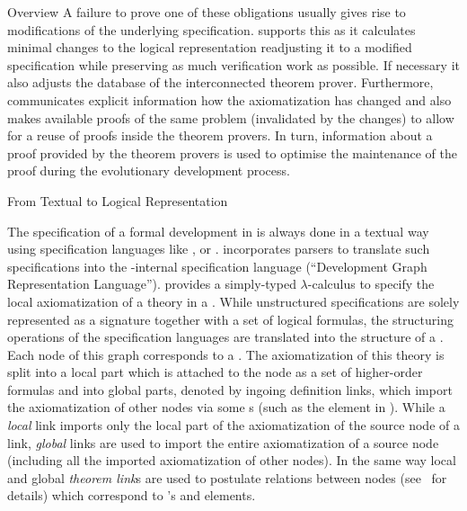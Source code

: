 \begin{omgroup}[id=maya,short=\maya,creators={autexier,hutter,mossakowski,shairer}]
\begin{omgroup}{Overview}
A failure to prove one of these obligations usually gives rise to modifications of the
underlying specification.  {\maya} supports this {} as it
calculates minimal changes to the logical representation readjusting it to a modified
specification while preserving as much verification work as possible.  If necessary it
also adjusts the database of the interconnected theorem prover.  Furthermore, {\maya}
communicates explicit information how the axiomatization has changed and also makes
available proofs of the same problem (invalidated by the changes) to allow for a reuse of
proofs inside the theorem provers. In turn, information about a proof provided by the
theorem provers is used to optimise the maintenance of the proof during the evolutionary
development process.
\end{omgroup}

\begin{omgroup}{From Textual to Logical Representation}

The specification of a formal development in {\maya} is always done in a textual way using
specification languages like {\casl} , {\omdoc} or {\vsesl}.  {\maya} incorporates parsers
to translate such specifications into the {\maya}-internal specification language {\dgrl}
(``Development Graph Representation Language'').  {\dgrl} provides a simply-typed
$\lambda$-calculus to specify the local axiomatization of a theory in a
{}. While unstructured specifications are solely represented
as a signature together with a set of logical formulas, the structuring operations of the
specification languages are translated into the structure of a
{}. Each node of this graph corresponds to a
{}. The axiomatization of this theory is split into a local part which is
attached to the node as a set of higher-order formulas and into global parts, denoted by
ingoing definition links, which import the axiomatization of other nodes via some
{s} (such as the {} element in {\omdoc}).
While a {\emph{local}} link imports only the local part of the
axiomatization of the source node of a link, {\emph{global}} links are
used to import the entire axiomatization of
\MAYAfigure
a source node (including all the imported axiomatization of other nodes).  In the same
way local and global {\emph{theorem link}s} are used to postulate relations between nodes
(see~\cite{AH-05-a} for details) which correspond to {\omdoc}'s
{} and {} elements.


\end{omgroup}
\end{omgroup}
